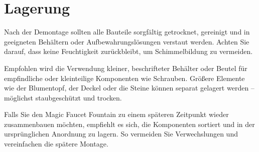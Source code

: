 %
%
%

\chapter{Lagerung}
Nach der Demontage sollten alle Bauteile sorgfältig getrocknet, gereinigt und in geeigneten Behältern oder Aufbewahrungslösungen verstaut werden. Achten Sie darauf, dass keine Feuchtigkeit zurückbleibt, um Schimmelbildung zu vermeiden.

Empfohlen wird die Verwendung kleiner, beschrifteter Behälter oder Beutel für empfindliche oder kleinteilige Komponenten wie Schrauben. Größere Elemente wie der Blumentopf, der Deckel oder die Steine können separat gelagert werden – möglichst staubgeschützt und trocken.

Falls Sie den Magic Faucet Fountain zu einem späteren Zeitpunkt wieder zusammenbauen möchten, empfiehlt es sich, die Komponenten sortiert und in der ursprünglichen Anordnung zu lagern. So vermeiden Sie Verwechslungen und vereinfachen die spätere Montage.